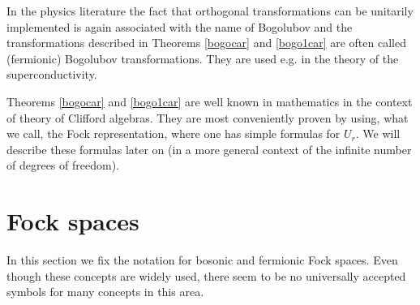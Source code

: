 \documentclass{svmult}
\def\cV{{\cal V}}
\def\cW{{\cal W}}
\def\otimesal{\vskip 0.2 em\mathop{ \hbox{\raise 1.45 ex
  \hbox{$\scriptscriptstyle\circ$}
\kern -1.0 em \hbox{$\otimes$}}}}
\def\otimesal{\mathop{\hbox{\raise 1.45 ex
  \hbox{$\scriptscriptstyle\circ$}
\kern -0.92 em \hbox{$\otimes$}}}}
\begin{document}
In the physics literature the fact that orthogonal transformations can be
unitarily implemented is again associated with the name of Bogolubov
and the transformations
described in Theorems \ref{bogocar} and \ref{bogo1car} are often called (fermionic)
  Bogolubov transformations. They are used e.g. in the theory
of the  superconductivity.

 Theorems  \ref{bogocar} and \ref{bogo1car}  are well known in mathematics
in the context of theory of Clifford algebras.
They are most conveniently proven by using, 
 what we call, the Fock representation,
 where one has simple formulas for $U_r$. 
We will describe these formulas later on (in a more general context of the
infinite number of degrees of freedom).























\section{Fock spaces}
\label{s5}
In this section we fix the notation for 
  bosonic and
fermionic Fock spaces. Even though these concepts are  widely used, there
seem to be  no universally accepted symbols for many concepts in this area. 
\end{document}
